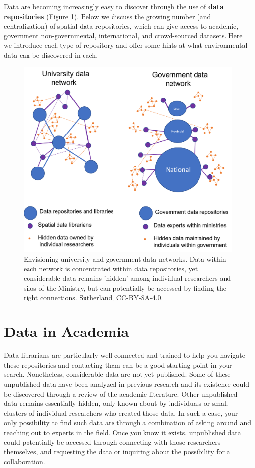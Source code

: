 \documentclass[
]{book}
\begin{document}
Data are becoming increasingly easy to discover through the use of \textbf{data repositories} (Figure \ref{fig:4-data-network-model}). Below we discuss the growing number (and centralization) of spatial data repositories, which can give access to academic, government non-governmental, international, and crowd-sourced datasets. Here we introduce each type of repository and offer some hints at what environmental data can be discovered in each.

\begin{figure}
\includegraphics[width=0.75\linewidth]{images/04-data-network-model} \caption{Envisioning university and government data networks. Data within each network is concentrated within data repositories, yet considerable data remains 'hidden' among individual researchers and silos of the Ministry, but can potentially be accessed by finding the right connections. Sutherland, CC-BY-SA-4.0.}\label{fig:4-data-network-model}
\end{figure}

\section{Data in Academia}\label{data-in-academia}

Data librarians are particularly well-connected and trained to help you navigate these repositories and contacting them can be a good starting point in your search. Nonetheless, considerable data are not yet published. Some of these unpublished data have been analyzed in previous research and its existence could be discovered through a review of the academic literature. Other unpublished data remains essentially hidden, only known about by individuals or small clusters of individual researchers who created those data. In such a case, your only possibility to find such data are through a combination of asking around and reaching out to experts in the field. Once you know it exists, unpublished data could potentially be accessed through connecting with those researchers themselves, and requesting the data or inquiring about the possibility for a collaboration.
\end{document}
